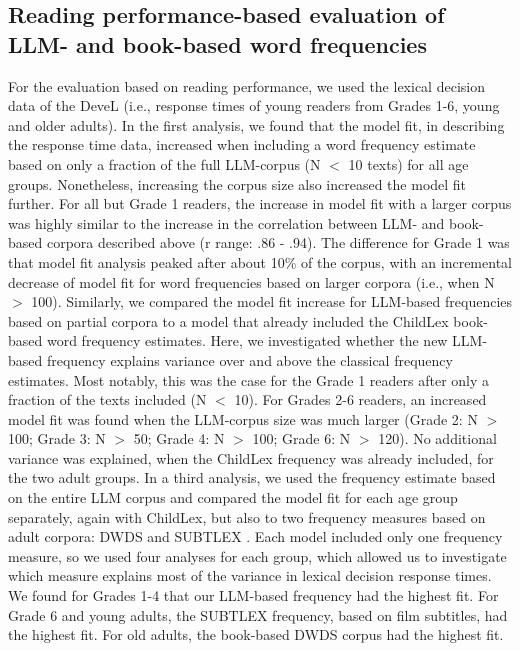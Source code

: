 \documentclass[jou, a4paper]{apa7}
\begin{document}
\subsection*{Reading performance-based evaluation of LLM- and book-based word frequencies}

For the evaluation based on reading performance, we used the lexical decision data of the DeveL (i.e., response times of young readers from Grades 1-6, young and older adults). In the first analysis, we found that the model fit, in describing the response time data, increased when including a word frequency estimate based on only a fraction of the full LLM-corpus (N $<$ 10 texts) for all age groups. Nonetheless, increasing the corpus size also increased the model fit further. For all but Grade 1 readers, the increase in model fit with a larger corpus was highly similar to the increase in the correlation between LLM- and book-based corpora described above (r range: .86 - .94). The difference for Grade 1 was that model fit analysis peaked after about 10\% of the corpus, with an incremental decrease of model fit for word frequencies based on larger corpora (i.e., when N $>$ 100). Similarly, we compared the model fit increase for LLM-based frequencies based on partial corpora to a model that already included the ChildLex book-based word frequency estimates. Here, we investigated whether the new LLM-based frequency explains variance over and above the classical frequency estimates. Most notably, this was the case for the Grade 1 readers after only a fraction of the texts included (N $<$ 10). For Grades 2-6 readers, an increased model fit was found when the LLM-corpus size was much larger (Grade 2: N $>$ 100; Grade 3: N $>$ 50; Grade 4: N $>$ 100; Grade 6: N $>$ 120). No additional variance was explained, when the ChildLex frequency was already included, for the two adult groups. In a third analysis, we used the frequency estimate based on the entire LLM corpus and compared the model fit for each age group separately, again with ChildLex, but also to two frequency measures based on adult corpora: DWDS \citep{heister_dlexdb_2011} and SUBTLEX \citep{brysbaert_word_2011}. Each model included only one frequency measure, so we used four analyses for each group, which allowed us to investigate which measure explains most of the variance in lexical decision response times. We found for Grades 1-4 that our LLM-based frequency had the highest fit. For Grade 6 and young adults, the SUBTLEX frequency, based on film subtitles, had the highest fit. For old adults, the book-based DWDS corpus had the highest fit.   
\end{document}
